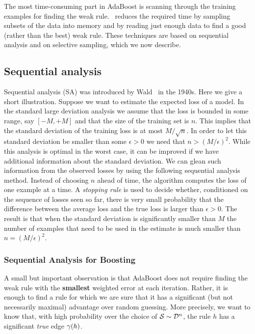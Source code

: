 The most time-consuming part in AdaBoost is scanning through the
training examples for finding the weak rule.
\Sparrow\ reduces the required time by sampling subsets of the data into
memory and by reading just enough data to find a good (rather than the
best) weak rule. These techniques are based on sequential analysis and
on selective sampling, which we now describe.

\subsection{Sequential analysis}
Sequential analysis (SA) was introduced by
Wald~\cite{wald_sequential_1973} in the 1940s.  Here we give a short
illustration. Suppose we want to estimate the expected loss of a
model. In the standard large deviation analysis we assume that the
loss is bounded in some range, say $[-M,+M]$ and that the size of the
training set is $n$. This implies that the standard deviation of the
training loss is at most $M/\sqrt{n}$. In order to let this standard
deviation be smaller than some $\epsilon>0$ we need that
$n > (M/\epsilon)^2$. While this analysis is optimal in the worst case, it
can be improved if we have additional information about the standard
deviation. We can glean such information from the observed losses by
using the following sequential analysis method. Instead of choosing
$n$ ahead of time, the algorithm computes the loss of one example at a
time. A {\em stopping rule} is used to decide whether, conditioned on
the sequence of losses seen so far, there is very small probability
that the difference between the average loss and the true loss is
larger than $\epsilon>0$. The result is that when the standard
deviation is significantly smaller than $M$ the number of examples
that need to be used in the estimate is much smaller than
$n=(M/\epsilon)^2$.

\subsubsection{Sequential Analysis for Boosting}\label{sec:methods:early-stop}

A small but important observation is that AdaBoost does not require
finding the weak rule with the {\bf smallest} weighted error at each
iteration. Rather, it is enough to find a rule for which we are sure
that it has a significant (but not necessarily maximal) advantage over
random guessing.
More precisely, we want to know that, with high
probability over the choice of ${\cal S} \sim {\cal D}^n$, the rule $h$
has a significant {\em true} edge $\gamma(h)$.

